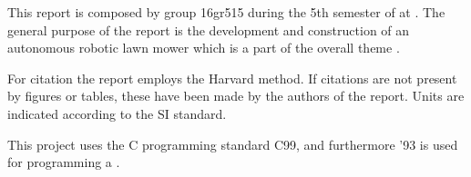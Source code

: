 This report is composed by group 16gr515 during the 5th semester of \projectFaculty{} at \AAU{}. The general purpose of the report is the development and construction of an autonomous robotic lawn mower which is a part of the overall theme \textit{\projectTheme}. 

For citation the report employs the Harvard method. If citations are not present by figures or tables, these have been made by the authors of the report. Units are indicated according to the SI standard.


This project uses the C programming standard C99, and furthermore '93 is used for programming a .

